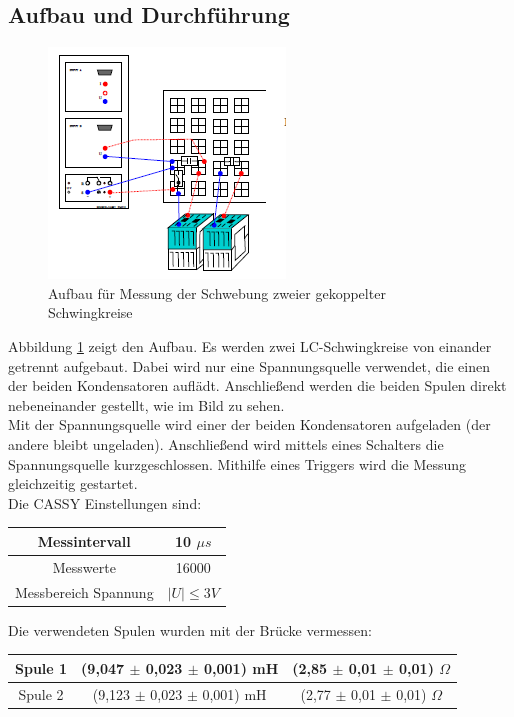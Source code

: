 \documentclass[12pt,a4paper]{article}
\begin{document}
\subsection{Aufbau und Durchführung}
\begin{figure}
\begin{center}
\includegraphics[scale=1.2]{Bilder/Schwebung_Aufbau.PNG}
\end{center}
\caption[Aufbau Schwebung]{Aufbau für Messung der Schwebung zweier gekoppelter Schwingkreise}
\label{fig:Schwebung_Aufbau}
\end{figure}
Abbildung \ref{fig:Schwebung_Aufbau} zeigt den Aufbau. Es werden zwei LC-Schwingkreise von einander getrennt aufgebaut. Dabei wird nur eine Spannungsquelle verwendet, die einen der beiden Kondensatoren auflädt. Anschließend werden die beiden Spulen direkt nebeneinander gestellt, wie im Bild zu sehen. \\
Mit der Spannungsquelle wird einer der beiden Kondensatoren aufgeladen (der andere bleibt ungeladen). Anschließend wird mittels eines Schalters die Spannungsquelle kurzgeschlossen. Mithilfe eines Triggers wird die Messung gleichzeitig gestartet. \\
Die CASSY Einstellungen sind: \\
\begin{center}
\begin{tabular}{|c|c|}
\hline 
Messintervall & 10 $\mu s$ \\ 
\hline 
Messwerte & 16000 \\ 
\hline 
Messbereich Spannung & $|U| \leq 3V$ \\ 
\hline 
\end{tabular}
\end{center}

Die verwendeten Spulen wurden mit der Brücke vermessen: \\
\begin{center}
\begin{tabular}{|c|c|c|}
\hline 
Spule 1 & (9,047 $\pm$ 0,023 $\pm$ 0,001) mH & (2,85 $\pm$ 0,01 $\pm$ 0,01) $\Omega$ \\ 
\hline 
Spule 2 & (9,123 $\pm$ 0,023 $\pm$ 0,001) mH & (2,77 $\pm$ 0,01 $\pm$ 0,01) $\Omega$ \\ 
\hline 
\end{tabular} 
\end{center}
\end{document}
